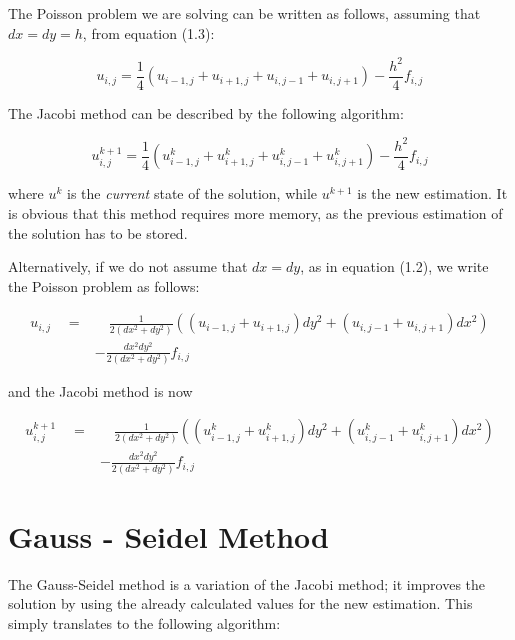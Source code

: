 \documentclass[11pt]{report}
\begin{document}
The Poisson problem we are solving can be written as follows, assuming that $dx = dy = h$, from equation (1.3): 

\begin{equation}
u_{i,j} = \frac{1}{4} \left(  u_{i-1, j} + u_{i+1, j} + u_{i, j-1} + u_{i, j+1}  \right) - \frac{h^2}{4}f_{i,j}
\end{equation}

The Jacobi method can be described by the following algorithm:

\begin{equation}
u_{i,j}^{k+1} = \frac{1}{4} \left(  u_{i-1, j}^k + u_{i+1, j}^k + u_{i, j-1}^k + u_{i, j+1}^k  \right) - \frac{h^2}{4}f_{i,j}
\end{equation}

where $u^{k}$ is the \emph{current} state of the solution, while $u^{k+1}$ is the new estimation. It is obvious that this method requires more memory, as the previous estimation of the solution has to be stored.
\newline

Alternatively, if we do not assume that $dx = dy$, as in equation (1.2), we write the Poisson problem as follows:

\begin{equation}
\begin{split}
u_{i,j} \quad = & \quad \frac{1}{2(dx^2 + dy^2)} \left(  (u_{i-1, j} + u_{i+1, j})dy^2 + (u_{i, j-1} + u_{i, j+1})dx^2  \right)\\
 & - \frac{dx^2 dy^2}{2(dx^2+dy^2)}f_{i,j}
\end{split}
\end{equation}

and the Jacobi method is now 

\begin{equation}
\begin{split}
u_{i,j}^{k+1} \quad = & \quad \frac{1}{2(dx^2 + dy^2)} \left(  (u_{i-1, j}^k + u_{i+1, j}^k)dy^2 + (u_{i, j-1}^k + u_{i, j+1}^k)dx^2  \right) \\
& - \frac{dx^2 dy^2}{2(dx^2+dy^2)}f_{i,j}
\end{split}
\end{equation}

\section{Gauss - Seidel Method}
The Gauss-Seidel method is a variation of the Jacobi method; it improves the solution by using the already calculated values for the new estimation. This simply translates to the following algorithm:
\end{document}
